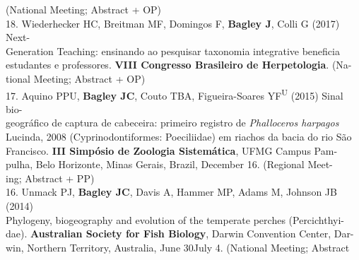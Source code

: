 \documentclass[margin,line]{res}
\begin{document}
\begin{resume}
\hspace*{8mm}(National Meeting; Abstract + OP) \\
18. Wiederhecker HC, Breitman MF, Domingos F, \textbf{Bagley J}, Colli G (2017) Next-\\
\hspace*{8mm} Generation Teaching: ensinando ao pesquisar taxonomia integrative beneficia\\
\hspace*{8mm} estudantes e professores. \textbf{VIII Congresso Brasileiro de Herpetologia}. (Na-\\ \vspace{2mm}
\hspace*{8mm}tional Meeting; Abstract + OP) \\
17. Aquino PPU, \textbf{Bagley JC}, Couto TBA, Figueira-Soares YF\textsuperscript{U} (2015) Sinal bio-\\
\hspace*{8mm} geogr\'{a}fico de captura de cabeceira: primeiro registro de \emph{Phalloceros harpagos}\\
\hspace*{8mm} Lucinda, 2008 (Cyprinodontiformes: Poeciliidae) em riachos da bacia do rio S\~{a}o\\
\hspace*{8mm} Francisco. \textbf{III Simp\'{o}sio de Zoologia Sistem\'{a}tica}, UFMG Campus Pam-\\
\hspace*{8mm}pulha, Belo Horizonte, Minas Gerais, Brazil, December 16. (Regional Meet-\\ \vspace{2mm}
\hspace*{8mm}ing; Abstract + PP) \\
16. Unmack PJ, \textbf{Bagley JC}, Davis A, Hammer MP, Adams M, Johnson JB (2014)\\
\hspace*{8mm} Phylogeny, biogeography and evolution of the temperate perches (Percichthyi-\\
\hspace*{8mm} dae). \textbf{Australian Society for Fish Biology}, Darwin Convention Center, Dar-\\
\hspace*{8mm} win, Northern Territory, Australia, June 30\textendash July 4. (National Meeting; Abstract \\ \vspace{2mm}

\end{resume}
\end{document}
